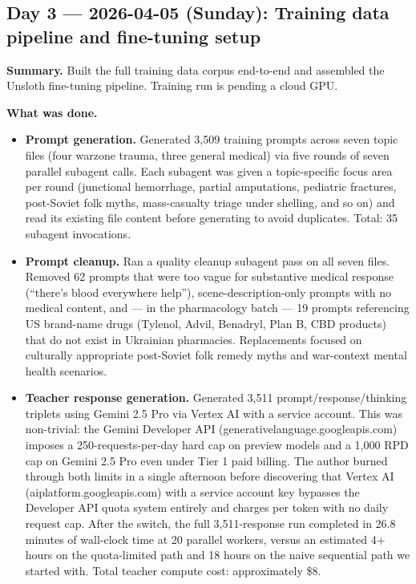 \documentclass{article}
\theoremstyle{plain}
\theoremstyle{definition}
\theoremstyle{remark}
\begin{document}
\subsection*{Day 3 --- 2026-04-05 (Sunday): Training data pipeline and fine-tuning setup}

\textbf{Summary.} Built the full training data corpus end-to-end and assembled the Unsloth fine-tuning pipeline. Training run is pending a cloud GPU.

\textbf{What was done.}
\begin{itemize}
\item \textbf{Prompt generation.} Generated 3{,}509 training prompts across seven topic files (four warzone trauma, three general medical) via five rounds of seven parallel subagent calls. Each subagent was given a topic-specific focus area per round (junctional hemorrhage, partial amputations, pediatric fractures, post-Soviet folk myths, mass-casualty triage under shelling, and so on) and read its existing file content before generating to avoid duplicates. Total: 35 subagent invocations.
\item \textbf{Prompt cleanup.} Ran a quality cleanup subagent pass on all seven files. Removed 62 prompts that were too vague for substantive medical response (``there's blood everywhere help''), scene-description-only prompts with no medical content, and --- in the pharmacology batch --- 19 prompts referencing US brand-name drugs (Tylenol, Advil, Benadryl, Plan B, CBD products) that do not exist in Ukrainian pharmacies. Replacements focused on culturally appropriate post-Soviet folk remedy myths and war-context mental health scenarios.
\item \textbf{Teacher response generation.} Generated 3{,}511 prompt/response/thinking triplets using Gemini 2.5 Pro via Vertex AI with a service account. This was non-trivial: the Gemini Developer API (generativelanguage.googleapis.com) imposes a 250-requests-per-day hard cap on preview models and a 1{,}000 RPD cap on Gemini 2.5 Pro even under Tier 1 paid billing. The author burned through both limits in a single afternoon before discovering that Vertex AI (aiplatform.googleapis.com) with a service account key bypasses the Developer API quota system entirely and charges per token with no daily request cap. After the switch, the full 3{,}511-response run completed in 26.8 minutes of wall-clock time at 20 parallel workers, versus an estimated 4+ hours on the quota-limited path and 18 hours on the naive sequential path we started with. Total teacher compute cost: approximately \$8.

\end{itemize}
\end{document}
